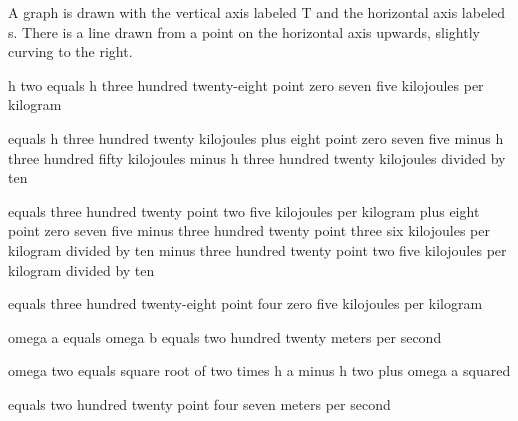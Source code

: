 A graph is drawn with the vertical axis labeled T and the horizontal axis labeled s. There is a line drawn from a point on the horizontal axis upwards, slightly curving to the right.

h two equals h three hundred twenty-eight point zero seven five kilojoules per kilogram

equals h three hundred twenty kilojoules plus eight point zero seven five minus h three hundred fifty kilojoules minus h three hundred twenty kilojoules divided by ten

equals three hundred twenty point two five kilojoules per kilogram plus eight point zero seven five minus three hundred twenty point three six kilojoules per kilogram divided by ten minus three hundred twenty point two five kilojoules per kilogram divided by ten

equals three hundred twenty-eight point four zero five kilojoules per kilogram

omega a equals omega b equals two hundred twenty meters per second

omega two equals square root of two times h a minus h two plus omega a squared

equals two hundred twenty point four seven meters per second